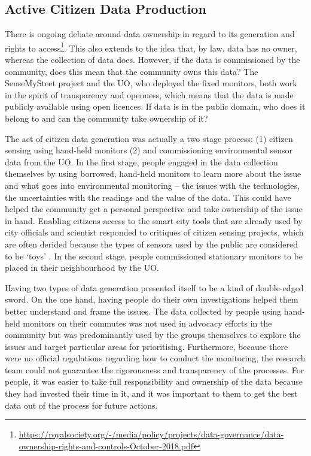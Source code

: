 \subsection{Active Citizen Data Production}
There is ongoing debate around data ownership in regard to its generation and rights to access\footnote{\url{https://royalsociety.org/-/media/policy/projects/data-governance/data-ownership-rights-and-controls-October-2018.pdf}}. This also extends to the idea that, by law, data has no owner, whereas the collection of data does. However, if the data is commissioned by the community, does this mean that the community owns this data? The SenseMySteet project and the UO, who deployed the fixed monitors, both work in the spirit of transparency and openness, which means that the data is made publicly available using open licences. If data is in the public domain, who does it belong to and can the community take ownership of it?
 
The act of citizen data generation was actually a two stage process: (1) citizen sensing using hand-held monitors (2) and commissioning environmental sensor data from the UO. In the first stage, people engaged in the data collection themselves by using borrowed, hand-held monitors to learn more about the issue and what goes into environmental monitoring -- the issues with the technologies, the uncertainties with the readings and the value of the data. This could have helped the community get a personal perspective and take ownership of the issue in hand. Enabling citizens access to the smart city tools that are already used by city officials and scientist responded to critiques of citizen sensing projects, which are often derided because the types of sensors used by the public are considered to be `toys' \citep{gabrys_just_2018}. In the second stage, people commissioned stationary monitors to be placed in their neighbourhood by the UO.
 
Having two types of data generation presented itself to be a kind of double-edged sword. On the one hand, having people do their own investigations helped them better understand and frame the issues. The data collected by people using hand-held monitors on their commutes was not used in advocacy efforts in the community but was predominantly used by the groups themselves to explore the issues and target particular areas for prioritising. Furthermore, because there were no official regulations regarding how to conduct the monitoring, the research team could not guarantee the rigorousness and transparency of the processes. For people, it was easier to take full responsibility and ownership of the data because they had invested their time in it, and it was important to them to get the best data out of the process for future actions.

